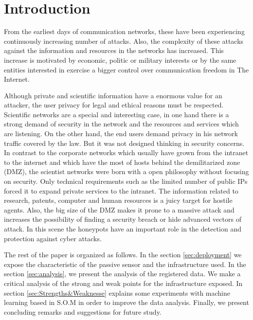 \documentclass[a4paper]{llncs}
\begin{document}
	
\section{Introduction}
From the earliest days of communication networks, these have been experiencing continuously increasing number of attacks\cite{esset-tendencias,cni-ccn-tendencias-2014,cni-ccn-tendencias-2015}. Also, the complexity of these attacks against the information and resources in the networks has increased. This increase is motivated by  economic, politic or military interests or by the same entities interested in exercise a bigger control over communication freedom in The Internet\cite{cni-ccn-tendencias-2015,cisco-2014}.
	
Although private and scientific information have a enormous value for an attacker, the user privacy for legal and ethical reasons must be respected. Scientific networks are a special and interesting case, in one hand there is a strong demand of security in the network and the resources and services which are listening. On the other hand, the end users demand privacy in his network traffic covered by the law. But it was not designed thinking in security concerns\cite{iris-proyecto}. In contrast to the corporate networks which usually have grown from the intranet to the internet and which have the most of hosts behind the demilitarized zone (DMZ), the scientist networks were born with a open philosophy without focusing on security\cite{iris-proyecto}. Only technical requirements such as the limited number of public IPs forced it to expand private services to the intranet. The information related to research, patents, computer and human resources is a juicy target for hostile agents. Also, the big size of the DMZ makes it prone to a massive attack and increases the possibility of finding a security breach or hide advanced vectors of attack. In this scene the honeypots have an important role in the detection and protection against cyber attacks.

The rest of the paper is organized as follows. In the section \ref{sec:deployment} we expose the characteristic of the passive sensor and the infrastructure used. In the section \ref{sec:analysis}, we present the analysis of the registered data. We make a critical analysis of the strong and weak points for the infrastructure exposed. In section \ref{sec:Strengths&Weaknesse} explains some experiments with machine learning based in S.O.M in order to improve the data analysis. Finally, we present concluding remarks and suggestions for future study.
\end{document}
